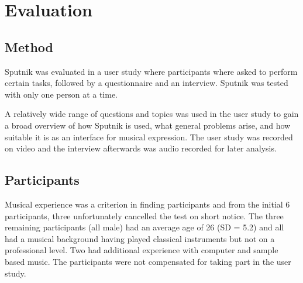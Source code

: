 \documentclass[10pt,a4paper]{scrartcl}
\begin{document}





\section{Evaluation}
\label{sec:evaluation}

\subsection{Method}
Sputnik was evaluated in a user study where participants where asked to perform certain tasks, followed by a questionnaire and an interview. Sputnik was tested with only one person at a time.

A relatively wide range of questions and topics was used in the user study to gain a broad overview of how Sputnik is used, what general problems arise, and how suitable it is as an interface for musical expression. The user study was recorded on video and the interview afterwards was audio recorded for later analysis.

\subsection{Participants}
Musical experience was a criterion in finding participants and from the initial 6 participants, three unfortunately cancelled the test on short notice. The three remaining participants (all male) had an average age of 26 (SD = 5.2) and all had a musical background having played classical instruments but not on a professional level. Two had additional experience with computer and sample based music. The participants were not compensated for taking part in the user study.
\end{document}
